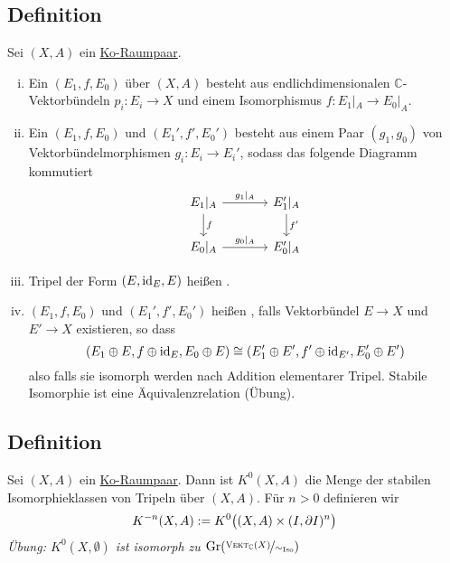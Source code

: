 \subsection[Definition: Tripel, Morphismus von Tripeln und stabile Isomorphie]{Definition} %
\label{sub:31}
Sei $(X,A)$ ein \hyperref[sub:13]{Ko-Raumpaar}.
\begin{enumerate}[(i)]
	\item Ein  $(E_1,f,E_0)$ über $(X,A)$ besteht aus endlichdimensionalen $\mathds{C}$-Vektorbündeln $p_i \colon E_i \to X$ und einem Isomorphismus
	$f \colon E_1|_A \to E_0|_A$.
	\item Ein  $(E_1,f,E_0)$ und $(E_1',f',E_0')$ besteht aus einem Paar $(g_1,g_0)$ von Vektorbündelmorphismen $g_i \colon E_i \to E_i'$,
	sodass das folgende Diagramm kommutiert
	\[
		\begin{tikzcd}[column sep=large]
			E_1|_A \rar["g_1|_A"] \dar["f"]& E_1'|_A \dar["f'"]\\
			E_0|_A \rar["g_0|_A"] & E_0'|_A
		\end{tikzcd}
	\] 
	\item Tripel der Form $(E,\id_E,E)$ heißen .
	\item $(E_1,f,E_0)$ und $(E_1',f',E_0')$ heißen , falls Vektorbündel $E \to X$ und $E' \to X$ existieren, so dass
	\[
		\enbrace*{E_1 \oplus E, f \oplus \id_E, E_0 \oplus E} \cong \enbrace*{E_1' \oplus E', f' \oplus \id_{E'}, E_0' \oplus E' } 
	\]
	also falls sie isomorph werden nach Addition elementarer Tripel.
	Stabile Isomorphie ist eine Äquivalenzrelation (Übung). 
\end{enumerate}

\subsection[Definition von $K^{-n}(X,A)$]{Definition} %
\label{sub:32}
Sei $(X,A)$ ein \hyperref[sub:13]{Ko-Raumpaar}. Dann ist $K^0(X,A)$ die Menge der stabilen Isomorphieklassen von Tripeln über $(X,A)$. Für $n>0$ definieren wir 
\[
	K^{-n}(X,A) := K^0 \enbrace[\big]{(X,A) \times (I,\partial I)^n} 
\]
\emph{Übung: $K^0(X,\emptyset)$ ist isomorph zu $\Gr \enbrace*{\nicefrac{\VEKT_\mathds{C}(X)}{\sim_{\Iso}}}$}

